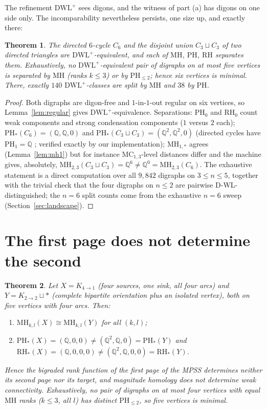 \documentclass[pdflatex,sn-mathphys,Numbered]{sn-jnl}
\theoremstyle{thmstyleone}
\newtheorem{theorem}{Theorem}[section]
\theoremstyle{thmstyletwo}
\newcommand{\MH}{\mathrm{MH}}
\newcommand{\PH}{\mathrm{PH}}
\newcommand{\RH}{\mathrm{RH}}
\newcommand{\MC}{\mathrm{MC}}
\newcommand{\QQ}{\mathbb{Q}}
\newcommand{\dwlp}{\mathrm{DWL}^{+}}
\begin{document}
The refinement $\dwlp$ sees digons, and the witness of part (a) has
digons on one side only. The incomparability nevertheless persists, one
size up, and exactly there:

\begin{theorem}\label{thm:dwlplus}
The directed $6$-cycle $C_6$ and the disjoint union $C_3 \sqcup C_3$ of
two directed triangles are $\dwlp$-equivalent, and each of $\MH$, $\PH$,
$\RH$ separates them. Exhaustively, no $\dwlp$-equivalent pair of
digraphs on at most five vertices is separated by $\MH$ (ranks
$k \le 3$) or by $\PH_{\le 2}$; hence six vertices is minimal. There,
exactly $140$ $\dwlp$-classes are split by $\MH$ and $38$ by $\PH$.
\end{theorem}

\begin{proof}
Both digraphs are digon-free and $1$-in-$1$-out regular on six vertices,
so Lemma~\ref{lem:regular} gives $\dwlp$-equivalence. Separations:
$\PH_0$ and $\RH_0$ count weak components and strong condensation
components ($1$ versus $2$ each); $\PH_\ast(C_6) = (\QQ, \QQ, 0)$ and
$\PH_\ast(C_3 \sqcup C_3) = (\QQ^2, \QQ^2, 0)$ (directed cycles have
$\PH_1 = \QQ$ \cite{GLMY12}; verified exactly by our implementation);
$\MH_{1,\ast}$ agrees (Lemma~\ref{lem:mh1}) but for instance
$\MC_{1,3}$-level distances differ and the machine gives, absolutely,
$\MH_{2,3}(C_3 \sqcup C_3) = \QQ^{6} \ne \QQ^{0} = \MH_{2,3}(C_6)$.
The exhaustive statement is a direct computation over all $9{,}842$
digraphs on $3 \le n \le 5$, together with the trivial check that the
four digraphs on $n \le 2$ are pairwise D-WL-distinguished; the $n = 6$
split counts come from the exhaustive $n = 6$ sweep
(Section~\ref{sec:landscape}).
\end{proof}

\section{The first page does not determine the second}\label{sec:e1e2}

\begin{theorem}\label{thm:e1e2}
Let $X = K_{4 \to 1}$ (four sources, one sink, all four arcs) and
$Y = K_{2\to 2} \sqcup \ast$ (complete bipartite orientation plus an
isolated vertex), both on five vertices with four arcs. Then:
\begin{enumerate}
\item[(a)] $\MH_{k,l}(X) \cong \MH_{k,l}(Y)$ for \emph{all} $(k,l)$;
\item[(b)] $\PH_\ast(X) = (\QQ, 0, 0) \ne (\QQ^2, \QQ, 0) = \PH_\ast(Y)$
and $\RH_\ast(X) = (\QQ, 0, 0, 0) \ne (\QQ^2, \QQ, 0, 0) =
\RH_\ast(Y)$.
\end{enumerate}
Hence the bigraded rank function of the first page of the MPSS determines
neither its second page nor its target, and magnitude homology does not
determine weak connectivity. Exhaustively, no pair of digraphs on at most
four vertices with equal $\MH$ ranks ($k \le 3$, all $l$) has distinct
$\PH_{\le 2}$, so five vertices is minimal.
\end{theorem}
\end{document}
